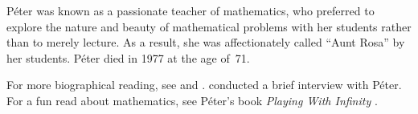 \documentclass[../../../include/open-logic-section]{subfiles}
\begin{document}
P\'{e}ter was known as a passionate teacher of mathematics, who
preferred to explore the nature and beauty of mathematical problems
with her students rather than to merely lecture. As a result, she was
affectionately called ``Aunt Rosa'' by her students. P\'eter died
in 1977 at the age of~71.

\begin{reading}
For more biographical reading, see \citep{Oconnor2014} and
\citep{Andrasfai1986}. \citet{Tamassy1994} conducted a brief interview
with P\'eter. For a fun read about mathematics, see P\'eter's book
\emph{Playing With Infinity} \citep{Peter2010}.
\end{reading}
\end{document}
